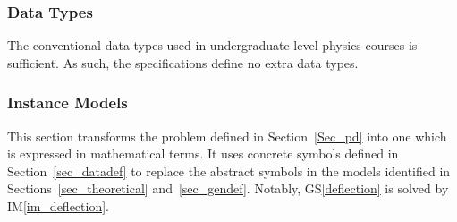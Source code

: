 \documentclass[12pt]{article}
\newcommand{\gsref}[1]{GS\ref{#1}}
\newcommand{\iref}[1]{IM\ref{#1}}
\begin{document}
\subsubsection{Data Types}
\label{sec_datatypes}

The conventional data types used in undergraduate-level physics courses is
sufficient. As such, the specifications define no extra data types.

\subsubsection{Instance Models}
\label{sec_instance}

This section transforms the problem defined in Section~\ref{Sec_pd} into one
which is expressed in mathematical terms. It uses concrete symbols defined in
Section~\ref{sec_datadef} to replace the abstract symbols in the models
identified in Sections~\ref{sec_theoretical} and~\ref{sec_gendef}. Notably,
\gsref{deflection} is solved by \iref{im_deflection}.

\end{document}
